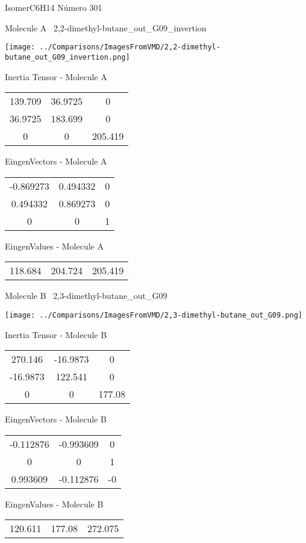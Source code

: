 \vtab[-3cm]
\begin{center}
{\large IsomerC6H14 \tab Número 301}
\end{center}
\begin{multicols}{2}
\begin{center}

Molecule A \
2,2-dimethyl-butane\_out\_G09\_invertion

\texttt{[image: ../Comparisons/ImagesFromVMD/2,2-dimethyl-butane\_out\_G09\_invertion.png]}

Inertia Tensor - Molecule A \\
\begin{tabular}{|c c c|}
139.709	 & 	36.9725	 & 	0	 \\
36.9725	 & 	183.699	 & 	0	 \\
0	 & 	0	 & 	205.419
\end{tabular}

\vtab
 EingenVectors - Molecule A     \\
\begin{tabular}{|c c c|}
-0.869273	 & 	0.494332	 & 	0	 \\
0.494332	 & 	0.869273	 & 	0	 \\
0	 & 	0	 & 	1
\end{tabular}

\vtab
 EingenValues - Molecule A     \\
\begin{tabular}{|c c c|}
118.684	 & 	204.724	 & 	205.419	 \\
\end{tabular}
\columnbreak

Molecule B \
2,3-dimethyl-butane\_out\_G09

\texttt{[image: ../Comparisons/ImagesFromVMD/2,3-dimethyl-butane\_out\_G09.png]}

Inertia Tensor - Molecule B \\
\begin{tabular}{|c c c|}
270.146	 & 	-16.9873	 & 	0	 \\
-16.9873	 & 	122.541	 & 	0	 \\
0	 & 	0	 & 	177.08
\end{tabular}

\vtab
 EingenVectors - Molecule B     \\
\begin{tabular}{|c c c|}
-0.112876	 & 	-0.993609	 & 	0	 \\
0	 & 	0	 & 	1	 \\
0.993609	 & 	-0.112876	 & 	-0
\end{tabular}

\vtab
 EingenValues - Molecule B     \\
\begin{tabular}{|c c c|}
120.611	 & 	177.08	 & 	272.075	 \\
\end{tabular}

\end{center}
\end{multicols}

